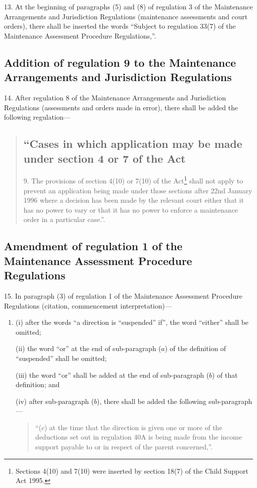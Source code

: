 \documentclass[a4paper]{article}
\begin{document}
13.  At the beginning of paragraphs (5) and (8) of regulation 3 of the Maintenance Arrangements and Jurisdiction Regulations (maintenance assessments and court orders), there shall be inserted the words “Subject to regulation 33(7) of the Maintenance Assessment Procedure Regulations,”.

\subsection[14. Addition of regulation 9 to the Maintenance Arrangements and Jurisdiction Regulations]{Addition of regulation 9 to the Maintenance Arrangements and Jurisdiction Regulations}

14.  After regulation 8 of the Maintenance Arrangements and Jurisdiction Regulations (assessments and orders made in error), there shall be added the following regulation—
\begin{quotation}
\subsection*{“Cases in which application may be made under section 4 or 7 of the Act}

9.  The provisions of section 4(10) or 7(10) of the Act\footnote{\frenchspacing Sections 4(10) and 7(10) were inserted by section 18(7) of the Child Support Act 1995.} shall not apply to prevent an application being made under those sections after 22nd January 1996 where a decision has been made by the relevant court either that it has no power to vary or that it has no power to enforce a maintenance order in a particular case.”.
\end{quotation}

\subsection[15. Amendment of regulation 1 of the Maintenance Assessment Procedure Regulations]{\sloppy Amendment of regulation 1 of the Maintenance Assessment Procedure Regulations}

15.  In paragraph (3) of regulation 1 of the Maintenance Assessment Procedure Regulations (citation, commencement interpretation)—
\begin{enumerate}\item[]
(i) after the words “a direction is “suspended” if”, the word “either” shall be omitted;

(ii) the word “or” at the end of sub-paragraph ($a$) of the definition of “suspended” shall be omitted;

(iii) the word “or” shall be added at the end of sub-paragraph ($b$) of that definition; and

(iv) after sub-paragraph ($b$), there shall be added the following sub-paragraph—
\begin{quotation}
“($c$) at the time that the direction is given one or more of the deductions set out in regulation 40A is being made from the income support payable to or in respect of the parent concerned,”.
\end{quotation}
\end{enumerate}
\end{document}
